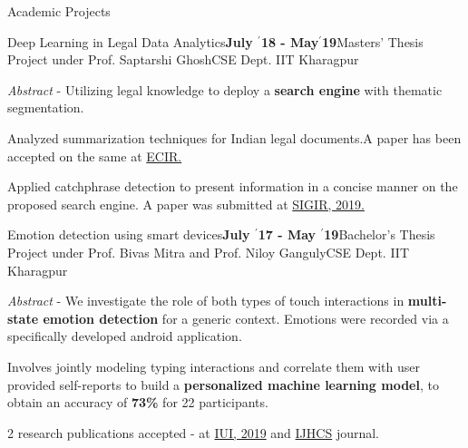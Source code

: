\documentclass{resume} %
\begin{document}
\begin{rSection}{Academic Projects}

\begin{rSubsection}{ \large Deep Learning in Legal Data Analytics}{\textbf{\large July $^{\prime}$18 - May$^{\prime}$19}}{Masters' Thesis Project under Prof. Saptarshi Ghosh}{CSE Dept. IIT Kharagpur}
\item \textit{Abstract} - Utilizing legal knowledge to deploy a \textbf{search engine} with thematic segmentation.
\item Analyzed summarization techniques for Indian legal documents.A paper has been accepted on the same at \href{http://ecir2019.org}{ECIR.}
\item Applied catchphrase detection to present information in a concise manner on the proposed search engine. A paper was submitted at \href{http://sigir.org/sigir2019/}{SIGIR, 2019.}
\end{rSubsection}

\begin{rSubsection}{ \large Emotion detection using smart devices}{\textbf{\large July $^{\prime}$17 - May $^{\prime}$19}}{Bachelor's Thesis Project under Prof. Bivas Mitra and Prof. Niloy Ganguly}{CSE Dept. IIT Kharagpur}
\item \textit{Abstract} - We investigate the role of both types of touch interactions in \textbf{multi-state emotion detection} for a generic context. Emotions were recorded via a specifically developed android application.

\item Involves jointly modeling typing interactions and correlate them with user provided self-reports to build a \textbf{personalized machine learning model}, to obtain an accuracy of \textbf{73\%} for 22 participants.

\item 2 research publications accepted - at \href{https://iui.acm.org/2019}{IUI, 2019} and \href{https://www.journals.elsevier.com/international-journal-of-human-computer-studies}{IJHCS} journal.
\end{rSubsection}


\end{rSection}
\end{document}
